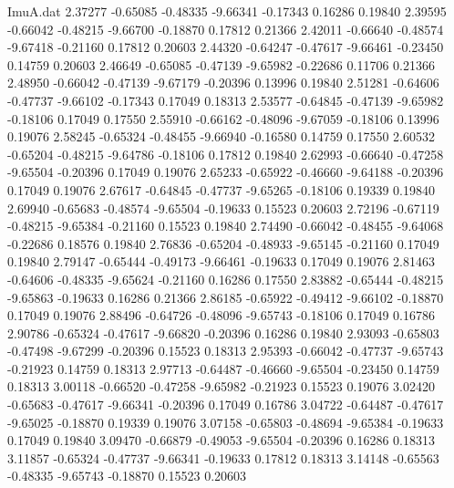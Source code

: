 \begin{filecontents}{ImuA.dat}
   2.37277   -0.65085   -0.48335   -9.66341   -0.17343    0.16286    0.19840
   2.39595   -0.66042   -0.48215   -9.66700   -0.18870    0.17812    0.21366
   2.42011   -0.66640   -0.48574   -9.67418   -0.21160    0.17812    0.20603
   2.44320   -0.64247   -0.47617   -9.66461   -0.23450    0.14759    0.20603
   2.46649   -0.65085   -0.47139   -9.65982   -0.22686    0.11706    0.21366
   2.48950   -0.66042   -0.47139   -9.67179   -0.20396    0.13996    0.19840
   2.51281   -0.64606   -0.47737   -9.66102   -0.17343    0.17049    0.18313
   2.53577   -0.64845   -0.47139   -9.65982   -0.18106    0.17049    0.17550
   2.55910   -0.66162   -0.48096   -9.67059   -0.18106    0.13996    0.19076
   2.58245   -0.65324   -0.48455   -9.66940   -0.16580    0.14759    0.17550
   2.60532   -0.65204   -0.48215   -9.64786   -0.18106    0.17812    0.19840
   2.62993   -0.66640   -0.47258   -9.65504   -0.20396    0.17049    0.19076
   2.65233   -0.65922   -0.46660   -9.64188   -0.20396    0.17049    0.19076
   2.67617   -0.64845   -0.47737   -9.65265   -0.18106    0.19339    0.19840
   2.69940   -0.65683   -0.48574   -9.65504   -0.19633    0.15523    0.20603
   2.72196   -0.67119   -0.48215   -9.65384   -0.21160    0.15523    0.19840
   2.74490   -0.66042   -0.48455   -9.64068   -0.22686    0.18576    0.19840
   2.76836   -0.65204   -0.48933   -9.65145   -0.21160    0.17049    0.19840
   2.79147   -0.65444   -0.49173   -9.66461   -0.19633    0.17049    0.19076
   2.81463   -0.64606   -0.48335   -9.65624   -0.21160    0.16286    0.17550
   2.83882   -0.65444   -0.48215   -9.65863   -0.19633    0.16286    0.21366
   2.86185   -0.65922   -0.49412   -9.66102   -0.18870    0.17049    0.19076
   2.88496   -0.64726   -0.48096   -9.65743   -0.18106    0.17049    0.16786
   2.90786   -0.65324   -0.47617   -9.66820   -0.20396    0.16286    0.19840
   2.93093   -0.65803   -0.47498   -9.67299   -0.20396    0.15523    0.18313
   2.95393   -0.66042   -0.47737   -9.65743   -0.21923    0.14759    0.18313
   2.97713   -0.64487   -0.46660   -9.65504   -0.23450    0.14759    0.18313
   3.00118   -0.66520   -0.47258   -9.65982   -0.21923    0.15523    0.19076
   3.02420   -0.65683   -0.47617   -9.66341   -0.20396    0.17049    0.16786
   3.04722   -0.64487   -0.47617   -9.65025   -0.18870    0.19339    0.19076
   3.07158   -0.65803   -0.48694   -9.65384   -0.19633    0.17049    0.19840
   3.09470   -0.66879   -0.49053   -9.65504   -0.20396    0.16286    0.18313
   3.11857   -0.65324   -0.47737   -9.66341   -0.19633    0.17812    0.18313
   3.14148   -0.65563   -0.48335   -9.65743   -0.18870    0.15523    0.20603

\end{filecontents}
